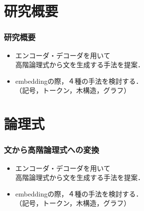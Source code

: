 \documentclass[dvipdfmx]{beamer}
\begin{document}



\section{研究概要}
\begin{frame}
\frametitle{研究概要}
\begin{center}
\end{center}

\begin{itemize}
  \item エンコーダ・デコーダを用いて\\高階論理式から文を生成する手法を提案．
  \item embeddingの際，４種の手法を検討する．\\（記号，トークン，木構造，グラフ）　
\end{itemize}


\end{frame}


\section{論理式}
\begin{frame}
\frametitle{文から高階論理式への変換}
\begin{center}
\end{center}

\begin{itemize}
  \item エンコーダ・デコーダを用いて\\{\color{berry}高階論理式}から文を生成する手法を提案．
  \item embeddingの際，４種の手法を検討する．\\（記号，トークン，木構造，グラフ）　
\end{itemize}

\end{frame}
\end{document}
